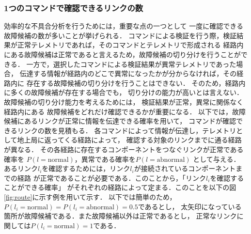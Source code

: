\documentclass[11pt]{jsreport}
\begin{document}
\subsubsection{1つのコマンドで確認できるリンクの数}
効率的な不具合分析を行うためには，重要な点の一つとして
一度に確認できる故障候補の数が多いことが挙げられる．
コマンドによる検証を行う際，検証結果が正常テレメトリであれば，そのコマンドとテレメトリで形成される
経路内にある故障候補は正常であると言えるため，故障候補の切り分けを行うことができる．
一方で，選択したコマンドによる検証結果が異常テレメトリであった場合，
伝達する情報が経路内のどこで異常になったかが分からなければ，その経路内に
存在する故障候補の切り分けを行うことはできない．
そのため，経路内に多くの故障候補が存在する場合でも，
切り分けの能力が高いとは言えない．故障候補の切り分け能力を考えるためには，
検証結果が正常，異常に関係なく経路内にある
故障候補をどれだけ確認できるかが重要になる．
以下では，故障候補にあるリンクが正常に情報を伝達できる確率を用いて，
コマンドが確認できるリンクの数を見積もる．
各コマンドによって情報が伝達し，テレメトリとして地上局に返ってくる経路によって，
確認する対象のリンクまでに通る経路が異なる．
その各経路に存在するコンポーネントをつなぐリンクが正常である確率を
$P(l = \text{normal})$，異常である確率を$P(l = \text{abnormal})$ %
として与える．
あるリンク$l_i$を確認するためには，リンク$l_i$が接続されているコンポーネントまでの経路
が正常であることが必要である．このことから，「リンク$l_i$を確認することができる確率」
がそれぞれの経路によって定まる．このことを以下の図\ref{fig:route}に示す例を用いて示す．
以下では簡単のため，$P(l_i = \text{normal}) = P(l_i = \text{abnormal}) = 0.5$であるとし，
太矢印になっている箇所が故障候補である．また故障候補以外は正常であるとし，
正常なリンクに関しては$P(l_i = \text{normal}) =1$である．\\
\end{document}

